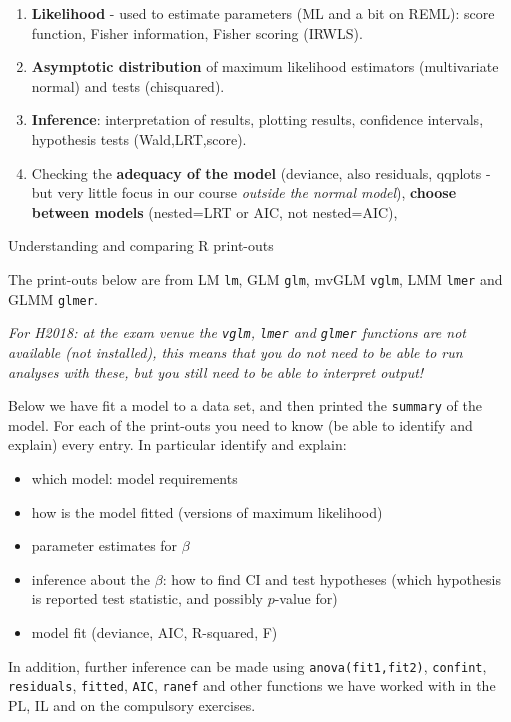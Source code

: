 \documentclass[ignorenonframetext,]{beamer}
\providecommand{\tightlist}{%
  \setlength{\itemsep}{0pt}\setlength{\parskip}{0pt}}
\begin{document}
\begin{frame}

\begin{enumerate}
\def\labelenumi{\arabic{enumi}.}
\setcounter{enumi}{1}
\item
  \textbf{Likelihood} - used to estimate parameters (ML and a bit on
  REML): score function, Fisher information, Fisher scoring (IRWLS).
\item
  \textbf{Asymptotic distribution} of maximum likelihood estimators
  (multivariate normal) and tests (chisquared).
\item
  \textbf{Inference}: interpretation of results, plotting results,
  confidence intervals, hypothesis tests (Wald,LRT,score).
\item
  Checking the \textbf{adequacy of the model} (deviance, also residuals,
  qqplots - but very little focus in our course \emph{outside the normal
  model}), \textbf{choose between models} (nested=LRT or AIC, not
  nested=AIC),
\end{enumerate}

\end{frame}

\begin{frame}[fragile]{Understanding and comparing R print-outs}

The print-outs below are from LM \texttt{lm}, GLM \texttt{glm}, mvGLM
\texttt{vglm}, LMM \texttt{lmer} and GLMM \texttt{glmer}.

\emph{For H2018: at the exam venue the \texttt{vglm}, \texttt{lmer} and
\texttt{glmer} functions are not available (not installed), this means
that you do not need to be able to run analyses with these, but you
still need to be able to interpret output!}

\end{frame}

\begin{frame}[fragile]

Below we have fit a model to a data set, and then printed the
\texttt{summary} of the model. For each of the print-outs you need to
know (be able to identify and explain) every entry. In particular
identify and explain:

\begin{itemize}
\tightlist
\item
  which model: model requirements
\item
  how is the model fitted (versions of maximum likelihood)
\item
  parameter estimates for \(\beta\)
\item
  inference about the \(\beta\): how to find CI and test hypotheses
  (which hypothesis is reported test statistic, and possibly \(p\)-value
  for)
\item
  model fit (deviance, AIC, R-squared, F)
\end{itemize}

In addition, further inference can be made using
\texttt{anova(fit1,fit2)}, \texttt{confint}, \texttt{residuals},
\texttt{fitted}, \texttt{AIC}, \texttt{ranef} and other functions we
have worked with in the PL, IL and on the compulsory exercises.

\end{frame}
\end{document}
